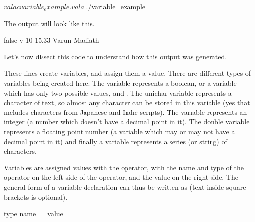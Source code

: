\begin{bashcommands}
$ valac variable_example.vala
$ ./variable_example
\end{bashcommands}

The output will look like this.

\begin{bashcommands}
false
v
10
15.33
Varun Madiath
\end{bashcommands}

Let's now dissect this code to understand how this output was generated.


These lines create variables, and assign them a value. There are different types of variables being created here. The  variable represents a boolean, or a variable which has only two possible values,  and . The unichar variable represents a character of text, so almost any character can be stored in this variable (yes that includes characters from Japanese and Indic scripts). The  variable represents an integer (a number which doesn't have a decimal point in it). The double variable represents a floating point number (a variable which may or may not have a decimal point in it) and finally a  variable represents a series (or string) of characters.

Variables are assigned values with the \inlinecode{=} operator, with the name and type of the operator on the left side of the operator, and the value on the right side. The general form of a variable declaration can thus be written as (text inside square brackets is optional).

\begin{bashcommands}
type name [= value]
\end{bashcommands}
